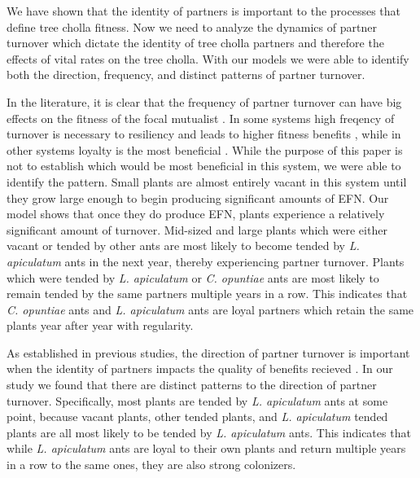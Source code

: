 \documentclass[11pt]{article}
\begin{document}
We have shown that the identity of partners is important to the processes that define tree cholla fitness. 
Now we need to analyze the dynamics of partner turnover which dictate the identity of tree cholla partners and therefore the effects of vital rates on the tree cholla. 
With our models we were able to identify both the direction, frequency, and distinct patterns of partner turnover. 

In the literature, it is clear that the frequency of partner turnover can have big effects on the fitness of the focal mutualist \cite{Fiala1994, Horvitz1986, Oliveira1999, Sachs2004}.
In some systems high freqency of turnover is necessary to resiliency and leads to higher fitness benefits \cite{Trojelsgaard2015}, while in other systems loyalty is the most beneficial \cite{Batstone2018}.
While the purpose of this paper is not to establish which would be most beneficial in this system, we were able to identify the pattern. 
Small plants are almost entirely vacant in this system until they grow large enough to begin producing significant amounts of EFN.
Our model shows that once they do produce EFN, plants experience a relatively significant amount of turnover.
Mid-sized and large plants which were either vacant or tended by other ants are most likely to become tended by \textit{L. apiculatum} ants in the next year, thereby experiencing partner turnover. 
Plants which were tended by \textit{L. apiculatum} or \textit{C. opuntiae} ants are most likely to remain tended by the same partners multiple years in a row. 
This indicates that \textit{C. opuntiae} ants and \textit{L. apiculatum} ants are loyal partners which retain the same plants year after year with regularity.


As established in previous studies, the direction of partner turnover is important when the identity of partners impacts the quality of benefits recieved \cite{Fonseca2003, Alonso1998, Dejean2008, Noe1994}.
In our study we found that there are distinct patterns to the direction of partner turnover. 
Specifically, most plants are tended by \textit{L. apiculatum} ants at some point, because vacant plants, other tended plants, and \textit{L. apiculatum} tended plants are all most likely to be tended by \textit{L. apiculatum} ants.
This indicates that while \textit{L. apiculatum} ants are loyal to their own plants and return multiple years in a row to the same ones, they are also strong colonizers. 
\end{document}
